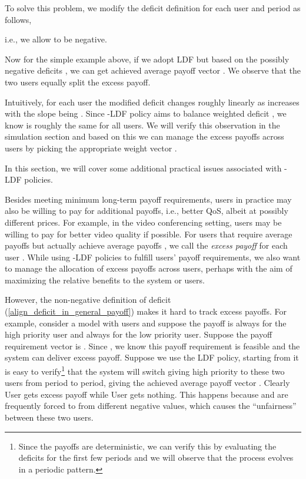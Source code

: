 \documentclass[prodmode,acmtompecs]{acmsmall}
\newcommand{\myComments}[1]{}
\newif\ifdissertation
\newcommand{\dissertationStart}{\ifdissertation  \myComments{Dissertation version: }}
\begin{document}
To solve this problem, we modify the deficit definition for each user  and period  as follows, 

i.e., we allow  to be negative. 

Now for the simple example above, if we adopt LDF but based on the possibly negative deficits , we can get achieved average payoff vector . We observe that the two users equally split the excess payoff. 

Intuitively, for each user  the modified deficit  changes roughly linearly as  increases with the slope being . Since -LDF policy aims to balance weighted deficit , we know  is roughly the same for all users.
We will verify this observation in the simulation section and based on this we can manage the excess payoffs across users by picking the appropriate weight vector . 

\dissertationStart
In this section, we will cover some additional practical issues associated with -LDF policies.  

Besides meeting minimum long-term payoff requirements, users in practice may also be willing to pay for additional payoffs, i.e., better QoS, albeit at possibly different prices. 
For example, in the video conferencing setting, users may be willing to pay for better video quality if possible. 
For users that require average payoffs  but actually achieve average payoffs , we call  the {\em excess payoff} for each user . While using -LDF policies to fulfill users' payoff requirements, we also want to manage the allocation of excess payoffs across users, perhaps with the aim of maximizing the relative benefits to the system or users. 

However, the non-negative definition of deficit (\ref{align_deficit_in_general_payoff}) makes it hard to track excess payoffs. For example, consider a model with  users and suppose the payoff is always  for the high priority user and always  for the low priority user. 
Suppose the payoff requirement vector is . Since , we know this payoff requirement is feasible and the system can deliver  excess payoff. 
Suppose we use the LDF policy, starting from  it is easy to verify\footnote{Since the payoffs are deterministic, we can verify this by evaluating the deficits for the first few periods and we will observe that the process  evolves in a periodic pattern. } that the system will switch giving high priority to these two users from period to period, giving the achieved average payoff vector . Clearly User  gets  excess payoff while User  gets nothing. 
This happens because  and  are frequently forced to  from different negative values, which causes the ``unfairness'' between these two users. 
\end{document}
